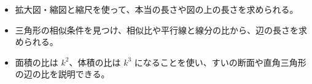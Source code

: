 \makeatletter
\newcommand\bkivdstep[2]{\par\addvspace{6pt}\Needspace{5\baselineskip}\noindent
  {\bkcircled[bkOrange]{#1}\enspace\sffamily\bfseries\color{bkOrange!75!black}#2}\par\nobreak\vspace{2pt}\noindent\ignorespaces}
\newcommand\bkivdline[1]{\par\addvspace{3pt}{\centering #1\par}\addvspace{3pt}\noindent\ignorespaces}
\newcommand\bkivdmidashi[1]{\par\addvspace{4pt}\Needspace{6\baselineskip}\noindent\textbf{#1}\par\noindent\ignorespaces}
\newcommand\bkivdright[3]{\draw[bkInk, line width=0.5pt] ($#1+(#2:2.2)$) -- ($#1+(#2:2.2)+(#3:2.2)$) -- ($#1+(#3:2.2)$);}
\newcommand\bkivdsun[2]{\begin{scope}[shift={#1}]
  \fill[bkYellow] (0,0) circle (#2);
  \foreach \bk@a in {0,45,...,315} {\draw[bkYellow!80!black, line width=0.8pt] (\bk@a:#2*1.35) -- (\bk@a:#2*1.8);}\end{scope}}
\newcommand\bkivdpoint[1]{\par\addvspace{4pt}\noindent{\sffamily\bfseries\color{bkBlue!80!black}ポイント}\enspace #1\par\addvspace{4pt}}
\makeatother


\begin{goal}
\begin{itemize}[label={\color{\bkTT}●}, leftmargin=1.6\zw, itemsep=0pt, topsep=1pt]
\item {}\enspace 拡大図・縮図と縮尺を使って、本当の長さや図の上の長さを求められる。
\item {}\enspace 三角形の相似条件を見つけ、相似比や平行線と線分の比から、辺の長さを求められる。
\item {}\enspace 面積の比は $k^2$、体積の比は $k^3$ になることを使い、すいの断面や直角三角形の辺の比を説明できる。
\end{itemize}
\end{goal}

